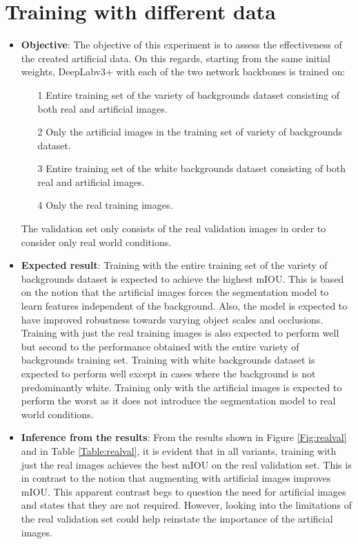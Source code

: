 \section{Training with different data}
\label{section:diffdata}

	\begin{itemize}
		\item \textbf{Objective}: The objective of this experiment is to assess the effectiveness of the created artificial data. On this regards, starting from the same initial weights, DeepLabv3+ with each of the two network backbones is trained on:
		\begin{itemize}
			\item[1] Entire training set of the variety of backgrounds dataset consisting of both real and artificial images.
			\item[2] Only the artificial images in the training set of variety of backgrounds dataset.
			\item[3] Entire training set of the white backgrounds dataset consisting of both real and artificial images.
			\item[4] Only the real training images.
		\end{itemize}
	The validation set only consists of the real validation images in order to consider only real world conditions.
		\item \textbf{Expected result}: Training with the entire training set of the variety of backgrounds dataset is expected to achieve the highest mIOU. This is based on the notion that the artificial images forces the segmentation model to learn features independent of the background. Also, the model is expected to have improved robustness towards varying object scales and occlusions. Training with just the real training images is also expected to perform well but second to the performance obtained with the entire variety of backgrounds training set. Training with white backgrounds dataset is expected to perform well except in cases where the background is not predominantly white. Training only with the artificial images is expected to perform the worst as it does not introduce the segmentation model to real world conditions.
		\item \textbf{Inference from the results}: From the results shown in Figure \ref{Fig:realval} and in Table \ref{Table:realval}, it is evident that in all variants, training with just the real images achieves the best mIOU on the real validation set. This is in contrast to the notion that augmenting with artificial images improves mIOU. This apparent contrast begs to question the need for artificial images and states that they are not required. However, looking into the limitations of the real validation set could help reinstate the importance of the artificial images.

\end{itemize}
